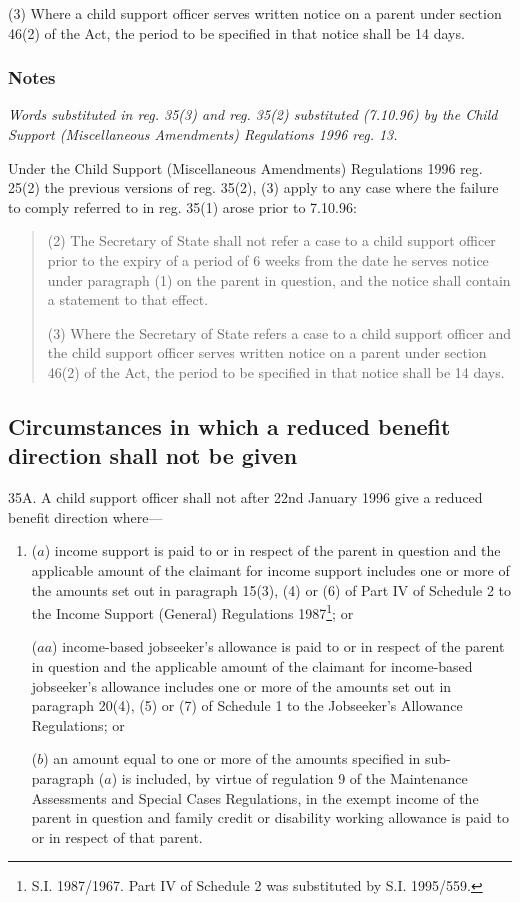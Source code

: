 \documentclass[a4paper]{article}
\newcommand\amendment[1]{\subsubsection*{Notes}{\itshape\frenchspacing\footnotesize #1 \par}}
\begin{document}
(3) Where 
a  %
child support officer serves written notice on a parent under section 46(2) of the Act, the period to be specified in that notice shall be 14 days.

\amendment{
Words substituted in reg. 35(3) and reg. 35(2) substituted (7.10.96) by the Child Support (Miscellaneous Amendments) Regulations 1996 reg. 13.

Under the Child Support (Miscellaneous Amendments) Regulations 1996 reg. 25(2) the previous versions of reg. 35(2), (3) apply to any case where the failure to comply referred to in reg. 35(1) arose prior to 7.10.96:
\begin{quotation}
(2) The Secretary of State shall not refer a case to a child support officer prior to the expiry of a period of 6 weeks from the date he serves notice under paragraph (1) on the parent in question, and the notice shall contain a statement to that effect.

(3) Where 
the Secretary of State refers a case to a child support officer and the 
child support officer serves written notice on a parent under section 46(2) of the Act, the period to be specified in that notice shall be 14 days.
\end{quotation}

}

\subsection[35A. Circumstances in which a reduced benefit direction shall not be given]{Circumstances in which a reduced benefit direction shall not be given}

35A.  A child support officer shall not after 22nd January 1996 give a reduced benefit direction where—
\begin{enumerate}\item[]
($a$) income support is paid to or in respect of the parent in question and the applicable amount of the claimant for income support includes one or more of the amounts set out in paragraph 15(3), (4) or (6) of Part IV of Schedule 2 to the Income Support (General) Regulations 1987\footnote{\frenchspacing S.I. 1987/1967. Part IV of Schedule 2 was substituted by S.I. 1995/559.}; or

($aa$) income-based jobseeker’s allowance is paid to or in respect of the parent in question and the applicable amount of the claimant for income-based jobseeker’s allowance includes one or more of the amounts set out in paragraph 20(4), (5) or (7) of Schedule 1 to the Jobseeker’s Allowance Regulations; or

($b$) an amount equal to one or more of the amounts specified in sub-paragraph ($a$) is included, by virtue of regulation 9 of the Maintenance Assessments and Special Cases Regulations, in the exempt income of the parent in question and family credit or disability working allowance is paid to or in respect of that parent.
\end{enumerate}
\end{document}
